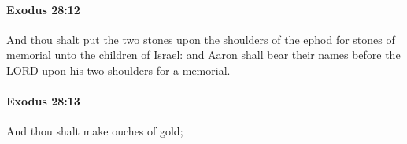 		\paragraph{Exodus 28:12} %
			\label{EXODUS-28-12}

			And thou shalt put the two stones upon the shoulders of the ephod for stones of memorial unto the children of Israel: and Aaron shall bear their names before the LORD upon his two shoulders for a memorial.


		\paragraph{Exodus 28:13} %
			\label{EXODUS-28-13}

			And thou shalt make ouches of gold;


